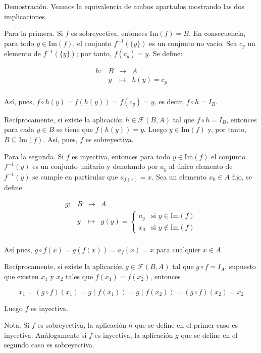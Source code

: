 Demostración. Veamos la equivalencia de ambos apartados mostrando las dos
implicaciones.

Para la primera. Si $f$ es sobreyectiva, entonces $\text{Im}(f) = B$. En
consecuencia, para todo $y \in \text{Im}(f)$, el conjunto $f^{-1}(\{y\})$ es
un conjunto no vacío. Sea $c_y$ un elemento de $f^{-1}(\{y\})$; por tanto,
$f(c_y) = y$. Se define:

$$
  \begin{array}{llll}
    h:  & B & \longrightarrow & A \\
        & y & \longmapsto     & h(y) = c_y \\
  \end{array}
$$

Así, pues, $f \circ h(y) = f(h(y)) = f(c_y) = y$, es decir, $f \circ h =
I_B$.

Recíprocamente, si existe la aplicación $h \in \mathcal{F}(B, A)$ tal que $f
\circ h = I_B$, entonces para cada $y \in B$ se tiene que $f(h(y)) = y$.
Luego $y \in \text{Im}(f)$ y, por tanto, $B \subseteq \text{Im}(f)$. Así,
pues, $f$ es sobreyectiva.

Para la segunda. Si $f$ es inyectiva, entonces para todo $y \in
\text{Im}(f)$ el conjunto $f^{-1}(y)$ es un conjunto unitario y denotando
por $a_y$ al único elemento de $f^{-1}(y)$ se cumple en particular que
$a_{f(x)} = x$. Sea un elemento $x_0 \in A$ fijo, se define

$$
  \begin{array}{llll}
    g:  & B & \longrightarrow & A \\
        & y & \longmapsto     & g(y) =
          \begin{cases}
            a_y & \text{si } y \in \text{Im}(f) \\
            x_0 & \text{si } y \notin \text{Im}(f)
          \end{cases}
        \\
  \end{array}
$$

Así pues, $g \circ f(x) = g(f(x)) = a_f(x) = x$ para cualquier $x \in A$.

Recíprocamente, si existe la aplicación $g \in \mathcal{F}(B, A)$ tal que $g
\circ f = I_A$, supuesto que existen $x_1$ y $x_2$ tales que $f(x_1) =
f(x_2)$, entonces

$$ x_1 = (g \circ f)(x_1) = g(f(x_1)) = g(f(x_2)) = (g \circ f)(x_2) = x_2
$$

\noindent Luego $f$ es inyectiva.

Nota. Si $f$ es sobreyectiva, la aplicación $h$ que se define en el primer
caso es inyectiva. Análogamente si $f$ es inyectiva, la aplicación $g$ que
se define en el segundo caso es sobreyectiva.

